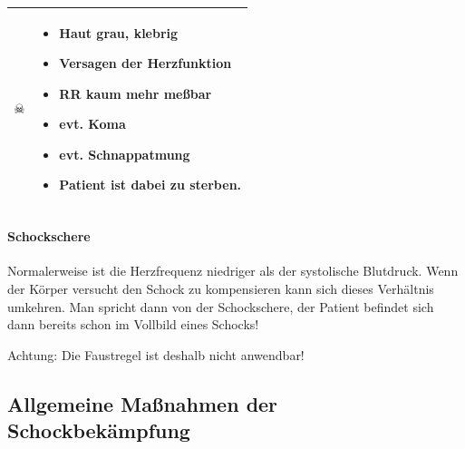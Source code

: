 \begin{center}
\begin{tabular}{m{3.5cm}m{8cm}}
\huge\centering $\skull$
 &
 \begin{itemize}
     \item Haut grau, klebrig
     \item Versagen der Herzfunktion
     \item RR kaum mehr meßbar
     \item evt. Koma
     \item evt. Schnappatmung
     \item Patient ist dabei zu sterben.
 \end{itemize}
\\\bottomrule
\end{tabular}
\end{center}


\paragraph{Schockschere}

Normalerweise ist die Herzfrequenz niedriger als der systolische
Blutdruck. Wenn der Körper versucht den Schock zu kompensieren kann
sich dieses Verhältnis umkehren. Man spricht dann von der
Schockschere, der Patient befindet sich dann bereits schon im Vollbild
eines Schocks! 

Achtung:  Die Faustregel ist deshalb nicht anwendbar!



\subsection{Allgemeine Maßnahmen der
Schockbekämpfung}\label{topic:schockbekaempfung}
\label{bkm:RefHeading38104902}


